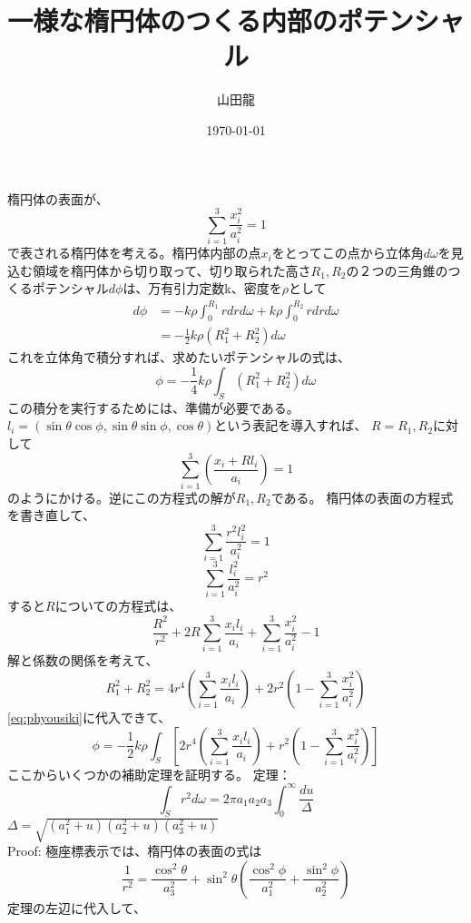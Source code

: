 \documentclass{jsarticle}
\date{\today}
\author{山田龍}
\title{一様な楕円体のつくる内部のポテンシャル}
\newcommand{\half}{\frac{1}{2}}
\newcommand{\beq}{\begin{equation}}
\newcommand{\eeq}{\end{equation}}
\newcommand{\xid}{x_i^2}
\newcommand{\lid}{l_i^2}
\newcommand{\aid}{a_i^2}
\newcommand{\sumit}{\sum_{i=1}^3}
\newcommand{\cosdt}{\cos^2\theta}
\newcommand{\sindt}{\sin^2\theta}
\newcommand{\cosdp}{\cos^2\phi}
\newcommand{\sindp}{\sin^2\phi}
\begin{document}
\maketitle
\section{}
楕円体の表面が、
\beq
\sum_{i=1}^3 \frac{\xid}{\aid} = 1
\eeq
で表される楕円体を考える。楕円体内部の点$x_i$をとってこの点から立体角$d\omega$を見込む領域を楕円体から切り取って、切り取られた高さ$R_1, R_2$の２つの三角錐のつくるポテンシャル$d\phi$は、万有引力定数k、密度を$\rho$として
\begin{align}
d\phi &= -k \rho \int_{0}^{R_1} r dr d\omega +
k \rho \int_{0}^{R_2} r dr d\omega\\
      &=  -\half k \rho (R_1^2 + R_2^2) d\omega
\end{align}
これを立体角で積分すれば、求めたいポテンシャルの式は、
\beq
\phi = -\frac{1}{4} k \rho \int_S (R_1^2 + R_2^2) d\omega\label{eq:phyousiki}
\eeq
この積分を実行するためには、準備が必要である。
$l_i = (\sin\theta \cos\phi, \sin\theta \sin\phi ,\cos\theta)$という表記を導入すれば、
$R = R_1, R_2$に対して
\beq
\sum_{i=1}^3 \left (\frac{x_i + R l_i}{a_i} \right) = 1\label{eq:daenl}
\eeq
のようにかける。逆にこの方程式の解が$R_1,R_2$である。
楕円体の表面の方程式を書き直して、
\beq
\sum_{i=1}^3 \frac{r^2 \lid}{\aid} = 1
\eeq
\beq
\sum_{i=1}^3 \frac{\lid}{\aid} = r^2
\eeq
すると$R$についての方程式は、
\beq
\frac{R^2}{r^2} + 2R\sumit \frac{x_i l_i}{a_i} + \sumit \frac{\xid}{\aid} - 1
\eeq
解と係数の関係を考えて、
\beq
R_1^2 + R_2^2 = 4r^4 \left(\sumit \frac{x_i l_i}{a_i} \right) + 2r^2 \left(1 -  \sumit \frac{\xid}{\aid}
\right)
\eeq
\eqref{eq:phyousiki}に代入できて、
\beq
\phi = -\frac{1}{2} k \rho \int_S \left[2r^4 \left(\sumit \frac{x_i l_i}{a_i} \right) + r^2 \left(1 -  \sumit \frac{\xid}{\aid}\right)\right]
\label{eq:steptwo}
\eeq
ここからいくつかの補助定理を証明する。
定理：
\beq
\int _S r^2 d\omega = 2 \pi a_1 a_2 a_3 \int_0^{\infty} \frac{du}{\Delta}
\eeq
$\Delta = \sqrt{(a_1^2 + u)(a_2^2 + u)(a_3^2 + u)}$\\
Proof:
極座標表示では、楕円体の表面の式は
\beq
\frac{1}{r^2} = \frac{\cosdt}{a_3^2} + \sindt(\frac{\cosdp}{a_1^2} + \frac{\sindp}{a_2^2})
\eeq
定理の左辺に代入して、
\end{document}
